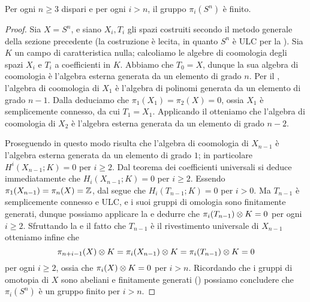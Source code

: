 \begin{theorem}
Per ogni \(n\ge 3\) dispari e per ogni \(i>n\), il gruppo \(\pi_i(S^n)\) è finito.
\end{theorem}
\begin{proof}
Sia \(X=S^n\), e siano \(X_i,T_i\) gli spazi costruiti secondo il metodo generale della sezione precedente (la costruzione è lecita, in quanto \(S^n\) è ULC per la ). Sia \(K\) un campo di caratteristica nulla; calcoliamo le algebre di coomologia degli spazi \(X_i\) e \(T_i\) a coefficienti in \(K\). Abbiamo che \(T_0=X\), dunque la sua algebra di coomologia è l'algebra esterna generata da un elemento di grado \(n\). Per il , l'algebra di coomologia di \(X_1\) è l'algebra di polinomi generata da un elemento di grado \(n-1\). Dalla  deduciamo che \(\pi_1(X_1)=\pi_2(X)=0\), ossia \(X_1\) è semplicemente connesso, da cui \(T_1=X_1\). Applicando il  otteniamo che l'algebra di coomologia di \(X_2\) è l'algebra esterna generata da un elemento di grado \(n-2\).

Proseguendo in questo modo risulta che l'algebra di coomologia di \(X_{n-1}\) è l'algebra esterna generata da un elemento di grado \(1\); in particolare \(H^i(X_{n-1};K)=0\) per \(i\ge 2\). Dal teorema dei coefficienti universali si deduce immediatamente che \(H_i(X_{n-1};K)=0\) per \(i\ge 2\). Essendo \(\pi_1(X_{n-1})=\pi_n(X)=\mathbb{Z}\), dal  segue che \(H_i(T_{n-1};K)=0\) per \(i>0\). Ma \(T_{n-1}\) è semplicemente connesso e ULC, e i suoi gruppi di omologia sono finitamente generati, dunque possiamo applicare la  e dedurre che \(\pi_i(T_{n-1})\mathbin{\otimes} K=0\) per ogni \(i\ge 2\). Sfruttando la  e il fatto che \(T_{n-1}\) è il rivestimento universale di \(X_{n-1}\) otteniamo infine che 
\[
\pi_{n+i-1}(X)\mathbin{\otimes} K=\pi_i(X_{n-1})\mathbin{\otimes} K=\pi_i(T_{n-1})\mathbin{\otimes} K=0
\]
per ogni \(i\ge 2\), ossia che \(\pi_i(X)\mathbin{\otimes} K=0\) per \(i>n\). Ricordando che i gruppi di omotopia di \(X\) sono abeliani e finitamente generati () possiamo concludere che \(\pi_i(S^n)\) è un gruppo finito per \(i>n\).
\end{proof}